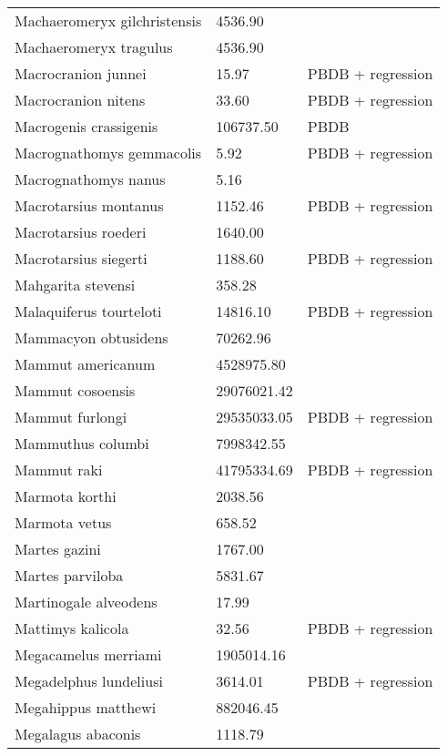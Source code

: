 \begin{center}
\begin{longtable}{p{} p{} p{} }
  Machaeromeryx gilchristensis & 4536.90 & \cite{Tomiya2013} \\ 
  Machaeromeryx tragulus & 4536.90 & \cite{Tomiya2013} \\ 
  Macrocranion junnei & 15.97 & PBDB + regression \\ 
  Macrocranion nitens & 33.60 & PBDB + regression \\ 
  Macrogenis crassigenis & 106737.50 & PBDB \\ 
  Macrognathomys gemmacolis & 5.92 & PBDB + regression \\ 
  Macrognathomys nanus & 5.16 & \cite{Tomiya2013} \\ 
  Macrotarsius montanus & 1152.46 & PBDB + regression \\ 
  Macrotarsius roederi & 1640.00 & \cite{Soligo2006} \\ 
  Macrotarsius siegerti & 1188.60 & PBDB + regression \\ 
  Mahgarita stevensi & 358.28 & \cite{Wortman1893} \\ 
  Malaquiferus tourteloti & 14816.10 & PBDB + regression \\ 
  Mammacyon obtusidens & 70262.96 & \cite{Tomiya2013} \\ 
  Mammut americanum & 4528975.80 & \cite{Smith2004} \\ 
  Mammut cosoensis & 29076021.42 & \cite{Secord2008a} \\ 
  Mammut furlongi & 29535033.05 & PBDB + regression \\ 
  Mammuthus columbi & 7998342.55 & \cite{Smith2004} \\ 
  Mammut raki & 41795334.69 & PBDB + regression \\ 
  Marmota korthi & 2038.56 & \cite{Tomiya2013} \\ 
  Marmota vetus & 658.52 & \cite{Tomiya2013} \\ 
  Martes gazini & 1767.00 & \cite{McKenna2011} \\ 
  Martes parviloba & 5831.67 & \cite{Macdonald1951} \\ 
  Martinogale alveodens & 17.99 & \cite{Tomiya2013} \\ 
  Mattimys kalicola & 32.56 & PBDB + regression \\ 
  Megacamelus merriami & 1905014.16 & \cite{Tomiya2013} \\ 
  Megadelphus lundeliusi & 3614.01 & PBDB + regression \\ 
  Megahippus matthewi & 882046.45 & \cite{Tomiya2013} \\ 
  Megalagus abaconis & 1118.79 & \cite{Tomiya2013} \\ 

\end{longtable}
\end{center}
